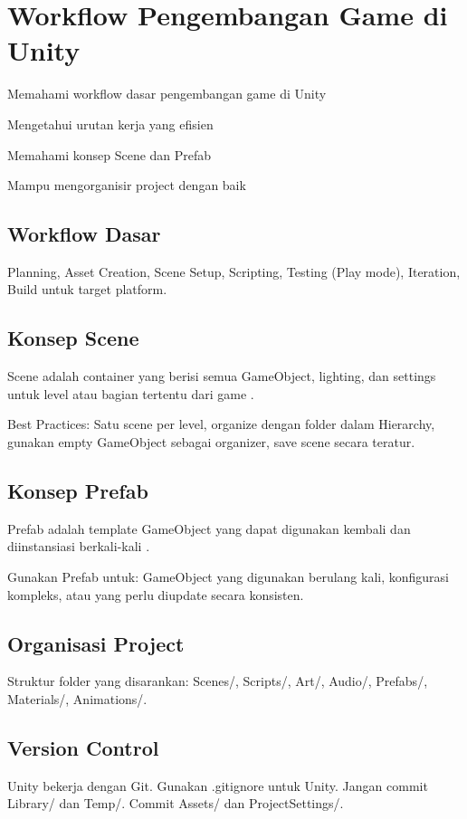 \section{Workflow Pengembangan Game di Unity}

\begin{learningoutcomes}
\item Memahami workflow dasar pengembangan game di Unity
\item Mengetahui urutan kerja yang efisien
\item Memahami konsep Scene dan Prefab
\item Mampu mengorganisir project dengan baik
\end{learningoutcomes}

\subsection{Workflow Dasar}

Planning, Asset Creation, Scene Setup, Scripting, Testing (Play mode), Iteration, Build untuk target platform.

\subsection{Konsep Scene}

\begin{definisi}[Scene]
Scene adalah container yang berisi semua GameObject, lighting, dan settings untuk level atau bagian tertentu dari game \cite{UnityManual2024}.
\end{definisi}

Best Practices: Satu scene per level, organize dengan folder dalam Hierarchy, gunakan empty GameObject sebagai organizer, save scene secara teratur.

\subsection{Konsep Prefab}

\begin{definisi}[Prefab]
Prefab adalah template GameObject yang dapat digunakan kembali dan diinstansiasi berkali-kali \cite{UnityManual2024}.
\end{definisi}

Gunakan Prefab untuk: GameObject yang digunakan berulang kali, konfigurasi kompleks, atau yang perlu diupdate secara konsisten.

\subsection{Organisasi Project}

Struktur folder yang disarankan: Scenes/, Scripts/, Art/, Audio/, Prefabs/, Materials/, Animations/.

\subsection{Version Control}

Unity bekerja dengan Git. Gunakan .gitignore untuk Unity. Jangan commit Library/ dan Temp/. Commit Assets/ dan ProjectSettings/.

